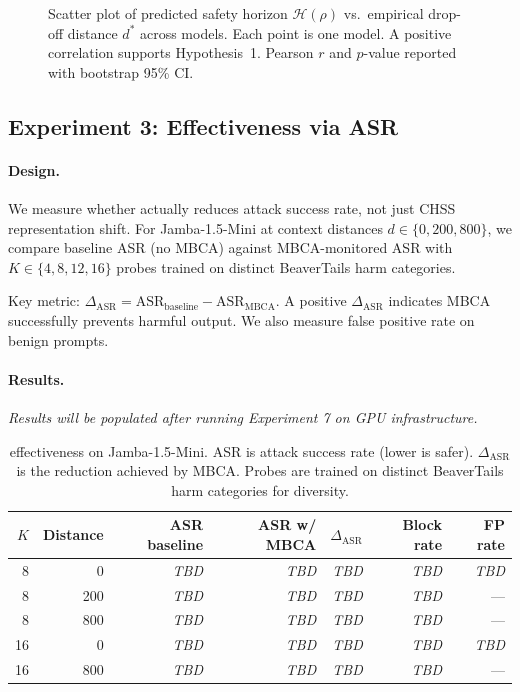 \documentclass{article}
\newcommand{\Horizon}{\mathcal{H}(\rho)}
\newcommand{\MBCA}{\mathrm{MBCA}}
\begin{document}
\begin{figure}[ht]
  \centering
  \fbox{\rule{0pt}{4.5cm}\rule{0.55\textwidth}{0pt}}
  \caption{Scatter plot of predicted safety horizon $\Horizon$ vs.\ empirical drop-off
           distance $d^*$ across models. Each point is one model. A positive correlation
           supports Hypothesis~1. Pearson $r$ and $p$-value reported with bootstrap 95\% CI.}
  \label{fig:scatter}
\end{figure}

\subsection{Experiment 3: \MBCA{} Effectiveness via ASR}
\label{sec:exp3}

\paragraph{Design.}
We measure whether \MBCA{} actually reduces attack success rate, not just CHSS
representation shift. For Jamba-1.5-Mini at context distances $d \in \{0, 200, 800\}$,
we compare baseline ASR (no MBCA) against MBCA-monitored ASR with $K \in \{4, 8, 12, 16\}$
probes trained on distinct BeaverTails harm categories.

Key metric: $\Delta_\text{ASR} = \text{ASR}_\text{baseline} - \text{ASR}_\text{MBCA}$.
A positive $\Delta_\text{ASR}$ indicates MBCA successfully prevents harmful output.
We also measure false positive rate on benign prompts.

\paragraph{Results.}
\emph{Results will be populated after running Experiment 7 on GPU infrastructure.}

\begin{table}[ht]
  \centering
  \caption{\MBCA{} effectiveness on Jamba-1.5-Mini. ASR is attack success rate (lower is
           safer). $\Delta_\text{ASR}$ is the reduction achieved by MBCA. Probes are
           trained on distinct BeaverTails harm categories for diversity.}
  \label{tab:mbca}
  \begin{tabular}{rrrrrrr}
    \toprule
    $K$ & \textbf{Distance} & \textbf{ASR baseline} & \textbf{ASR w/ MBCA} &
      $\Delta_\text{ASR}$ & \textbf{Block rate} & \textbf{FP rate} \\
    \midrule
    8  & 0   & \emph{TBD} & \emph{TBD} & \emph{TBD} & \emph{TBD} & \emph{TBD} \\
    8  & 200 & \emph{TBD} & \emph{TBD} & \emph{TBD} & \emph{TBD} & --- \\
    8  & 800 & \emph{TBD} & \emph{TBD} & \emph{TBD} & \emph{TBD} & --- \\
    16 & 0   & \emph{TBD} & \emph{TBD} & \emph{TBD} & \emph{TBD} & \emph{TBD} \\
    16 & 800 & \emph{TBD} & \emph{TBD} & \emph{TBD} & \emph{TBD} & --- \\
    \bottomrule
  \end{tabular}
\end{table}
\end{document}
